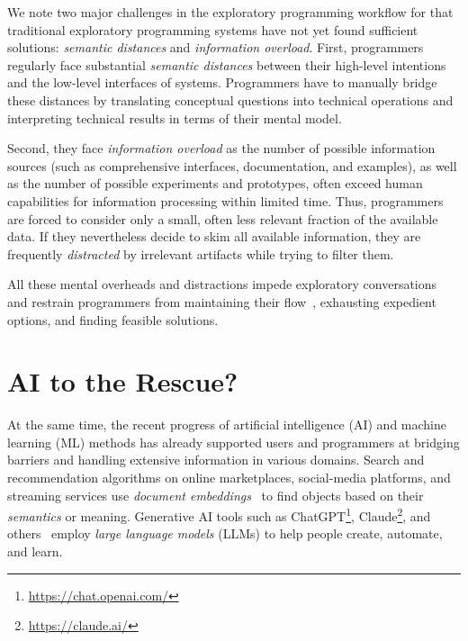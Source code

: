 We note two major challenges in the exploratory programming workflow for that traditional exploratory programming systems have not yet found sufficient solutions: \emph{semantic distances} and \emph{information overload}.
First, programmers regularly face substantial \emph{semantic distances} between their high-level intentions and the low-level interfaces of systems.
Programmers have to manually bridge these distances by translating conceptual questions into technical operations and interpreting technical results in terms of their mental model.

Second, they face \emph{information overload} as the number of possible information sources (such as comprehensive interfaces, documentation, and examples), as well as the number of possible experiments and prototypes, often exceed human capabilities for information processing within limited time.
Thus, programmers are forced to consider only a small, often less relevant fraction of the available data.
If they nevertheless decide to skim all available information, they are frequently \emph{distracted} by irrelevant artifacts while trying to filter them.

All these mental overheads and distractions impede exploratory conversations and restrain programmers from maintaining their flow~\cite{csikszentmihalyi2008flow}, exhausting expedient options, and finding feasible solutions.

\section*{AI to the Rescue?}

At the same time, the recent progress of artificial intelligence (AI) and machine learning (ML) methods has already supported users and programmers at bridging barriers and handling extensive information in various domains.
Search and recommendation algorithms on online marketplaces, social-media platforms, and streaming services use \emph{document embeddings}~\cite{mikolov2013efficient,devlin2019bert} to find objects based on their \emph{semantics} or meaning. %
Generative AI tools such as ChatGPT\footnote{\url{https://chat.openai.com/}}, Claude\footnote{\url{https://claude.ai/}}, and others~\cite{vaswani2017attention,radford2018improving,zhao2023survey} employ \emph{large language models} (LLMs) to help people create, automate, and learn. %

